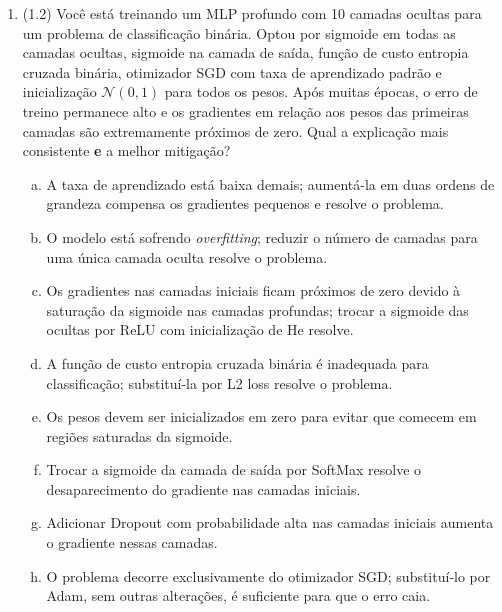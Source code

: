 \documentclass[11pt,a4paper]{article}
\begin{document}
\begin{enumerate}[1)]
\item (1.2) Você está treinando um MLP profundo com 10 camadas ocultas para um problema de classificação binária. Optou por sigmoide em todas as camadas ocultas, sigmoide na camada de saída, função de custo entropia cruzada binária, otimizador SGD com taxa de aprendizado padrão e inicialização $\mathcal{N}(0, 1)$ para todos os pesos. Após muitas épocas, o erro de treino permanece alto e os gradientes em relação aos pesos das primeiras camadas são extremamente próximos de zero. Qual a explicação mais consistente \textbf{e} a melhor mitigação?
\begin{enumerate}[a)]
    \item A taxa de aprendizado está baixa demais; aumentá-la em duas ordens de grandeza compensa os gradientes pequenos e resolve o problema.
    \item O modelo está sofrendo \textit{overfitting}; reduzir o número de camadas para uma única camada oculta resolve o problema.
    \item Os gradientes nas camadas iniciais ficam próximos de zero devido à saturação da sigmoide nas camadas profundas; trocar a sigmoide das ocultas por ReLU com inicialização de He resolve.
    \item A função de custo entropia cruzada binária é inadequada para classificação; substituí-la por L2 loss resolve o problema.
    \item Os pesos devem ser inicializados em zero para evitar que comecem em regiões saturadas da sigmoide.
    \item Trocar a sigmoide da camada de saída por SoftMax resolve o desaparecimento do gradiente nas camadas iniciais.
    \item Adicionar Dropout com probabilidade alta nas camadas iniciais aumenta o gradiente nessas camadas.
    \item O problema decorre exclusivamente do otimizador SGD; substituí-lo por Adam, sem outras alterações, é suficiente para que o erro caia.
\end{enumerate}

\pagebreak


\end{enumerate}
\end{document}
